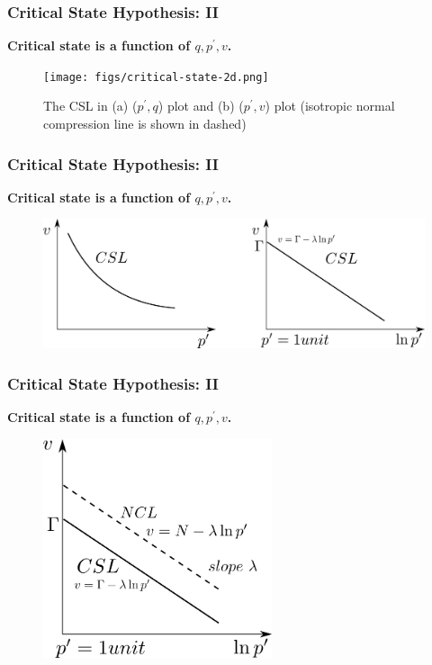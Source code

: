 \documentclass[notes]{beamer}
\begin{document}


\begin{frame}
\frametitle{Critical State Hypothesis: II}
\textbf{Critical state is a function of $q, p^\prime, v$. }
\begin{figure}
	\texttt{[image: figs/critical-state-2d.png]}
	\caption*{The CSL in (a) ($p^\prime, q$) plot and (b) ($p^\prime, v$) plot (isotropic normal compression line is shown in dashed)}
\end{figure}
\end{frame}

\begin{frame}
\frametitle{Critical State Hypothesis: II}
\textbf{Critical state is a function of $q, p^\prime, v$. }
\begin{figure}
	\includegraphics[width=\textwidth]{figs/v-lnp.png}
\end{figure}
\end{frame}

\begin{frame}
\frametitle{Critical State Hypothesis: II}
\textbf{Critical state is a function of $q, p^\prime, v$. }
\begin{figure}
	\includegraphics[width=0.6\textwidth]{figs/csl-ncl.png}
\end{figure}
\end{frame}
\end{document}

